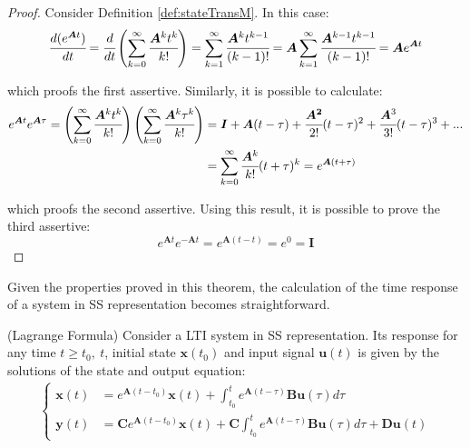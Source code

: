 \documentclass[a4paper,11pt]{book}
\numberwithin{figure}{chapter}
\numberwithin{equation}{chapter}
\numberwithin{table}{chapter}
\newtheorem{theorem}{Theorem}[chapter]
\theoremstyle{definition}
\newcounter{boxed-theorem}
\newenvironment{boxed-theorem}[1]
{\begin{shaded} \begin{theorem}{#1}}
{\end{theorem} \end{shaded}}
\begin{document}
\begin{proof}
	Consider Definition \ref{def:stateTransM}. In this case:
	\begin{equation}
		\cfrac{d ( e^{\bm{A} t})}{dt} = \cfrac{d}{dt} \left( \sum_{k=0}^{\infty} \cfrac{\bm{A}^k  t^k}{k!} \right) = \sum_{k=1}^{\infty} \cfrac{\bm{A}^k  t^{k-1}}{(k-1)!}  = \bm{A} \sum_{k=1}^{\infty} \cfrac{\bm{A}^{k-1}  t^{k-1}}{(k-1)!}  = \bm{A} e^{\bm{A} t}
	\end{equation}

\noindent which proofs the first assertive. Similarly, it is possible to calculate:
	\begin{equation}
	\begin{split}
		 e^{\bm{A} t} e^{\bm{A} \tau} = \left( \sum_{k=0}^{\infty} \cfrac{\bm{A}^k  t^k}{k!} \right) \left( \sum_{k=0}^{\infty} \cfrac{\bm{A}^k  \tau^k}{k!} \right) &= \bm{I} + \bm{A}(t-\tau) + \cfrac{\bm{A^2}}{2!}(t-\tau)^2 + \cfrac{\bm{A}^3}{3!}(t-\tau)^3 + ...  \\
		 &= \sum_{k=0}^{\infty} \cfrac{\bm{A}^k}{k!} (t + \tau)^{k} = e^{\bm{A} (t+\tau)}
	\end{split}
	\end{equation}

\noindent which proofs the second assertive.  Using this result, it is possible to prove the third assertive:
	\begin{equation}
		 e^{\bm{A} t} e^{-\bm{A} t} = e^{\bm{A} (t-t)} = e^{0} = \bm{I}  
	\end{equation} 
\end{proof}

Given the properties proved in this theorem, the calculation of the time response of a system in SS representation becomes straightforward.

\begin{boxed-theorem}{(Lagrange Formula)} \label{th:lagrangeForm}
	Consider a LTI system in SS representation. Its response for any time $t \geq t_0,\ t$, initial state $\bm{x}(t_0)$ and input signal $\bm{u}(t)$ is given by the solutions of the state and output equation:
	\begin{align}
	\begin{cases}
		\bm{x}(t) &= e^{\bm{A}(t - t_0)} \bm{x}(t) + \int_{t_0}^{t} e^{\bm{A}(t - \tau)} \bm{B} \bm{u}(\tau) d \tau \\
		\bm{y}(t) &= \bm{C} e^{\bm{A}(t - t_0)} \bm{x}(t) + \bm{C} \int_{t_0}^{t} e^{\bm{A}(t - \tau)} \bm{B} \bm{u}(\tau) d \tau + \bm{D} \bm{u}(t)
	\end{cases}
	\end{align}
\end{boxed-theorem}
\end{document}
